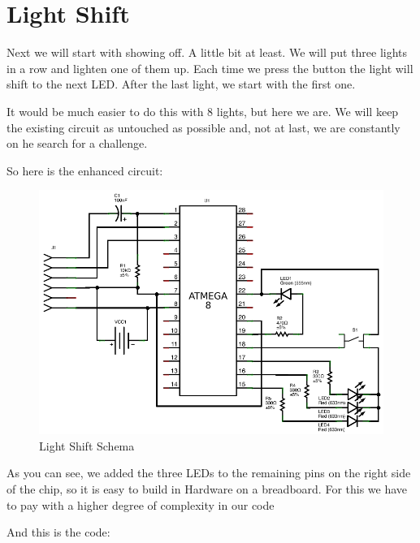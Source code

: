 \section{Light Shift}

Next we will start with showing off. A little bit at least. We will put three lights in a row and lighten one of them up. Each time we press the button the light will shift to the next LED. After the last light, we start with the first one.

It would be much easier to do this with 8 lights, but here we are. We will keep the existing circuit as untouched as possible and, not at last, we are constantly on he search for a challenge.

So here is the enhanced circuit:

\begin{figure}[htbp]
  \centering
  \includegraphics[width=120mm]{LED/S010_light-shift_Circuit_schema.png}
  \caption{Light Shift Schema}
  \label{atmega8-light-shift-schema}
\end{figure}

As you can see, we added the three LEDs to the remaining pins on the right side of the chip, so it is easy to build in Hardware on a breadboard. For this we have to pay with a higher degree of complexity in our code

And this is the code:

